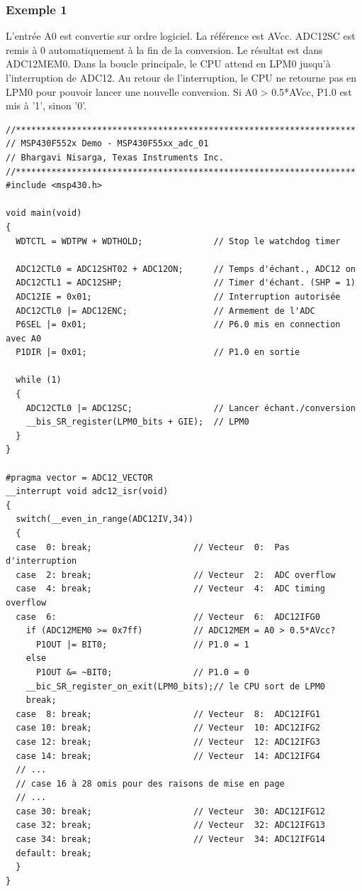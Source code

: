 \begin{minipage}{16cm}{
\subsubsection*{Exemple 1}
L'entrée A0 est convertie sur ordre logiciel. La référence est AVcc. ADC12SC est remis à 0 automatiquement à la fin de la conversion. Le résultat est dans ADC12MEM0. Dans la boucle principale, le CPU attend en LPM0 jusqu'à l'interruption de ADC12. Au retour de l'interruption, le CPU ne retourne pas en LPM0 pour pouvoir lancer une nouvelle conversion. Si A0 > 0.5*AVcc, P1.0 est mis à '1', sinon '0'.

\lstset{style=customc}
\begin{lstlisting}
//*******************************************************************
// MSP430F552x Demo - MSP430F55xx_adc_01
// Bhargavi Nisarga, Texas Instruments Inc.
//*******************************************************************
#include <msp430.h>

void main(void)
{
  WDTCTL = WDTPW + WDTHOLD;              // Stop le watchdog timer

  ADC12CTL0 = ADC12SHT02 + ADC12ON;      // Temps d'échant., ADC12 on
  ADC12CTL1 = ADC12SHP;                  // Timer d'échant. (SHP = 1)
  ADC12IE = 0x01;                        // Interruption autorisée
  ADC12CTL0 |= ADC12ENC;                 // Armement de l'ADC
  P6SEL |= 0x01;                         // P6.0 mis en connection avec A0
  P1DIR |= 0x01;                         // P1.0 en sortie

  while (1)
  {
    ADC12CTL0 |= ADC12SC;                // Lancer échant./conversion
    __bis_SR_register(LPM0_bits + GIE);  // LPM0
  }
}

#pragma vector = ADC12_VECTOR
__interrupt void adc12_isr(void)
{
  switch(__even_in_range(ADC12IV,34))
  {
  case  0: break;                    // Vecteur  0:  Pas d'interruption
  case  2: break;                    // Vecteur  2:  ADC overflow
  case  4: break;                    // Vecteur  4:  ADC timing overflow
  case  6:                           // Vecteur  6:  ADC12IFG0
    if (ADC12MEM0 >= 0x7ff)          // ADC12MEM = A0 > 0.5*AVcc?
      P1OUT |= BIT0;                 // P1.0 = 1
    else
      P1OUT &= ~BIT0;                // P1.0 = 0
    __bic_SR_register_on_exit(LPM0_bits);// le CPU sort de LPM0
    break;
  case  8: break;                    // Vecteur  8:  ADC12IFG1
  case 10: break;                    // Vecteur  10: ADC12IFG2
  case 12: break;                    // Vecteur  12: ADC12IFG3
  case 14: break;                    // Vecteur  14: ADC12IFG4
  // ...
  // case 16 à 28 omis pour des raisons de mise en page
  // ...
  case 30: break;                    // Vecteur  30: ADC12IFG12
  case 32: break;                    // Vecteur  32: ADC12IFG13
  case 34: break;                    // Vecteur  34: ADC12IFG14
  default: break; 
  }
}
\end{lstlisting}
}
\end{minipage}

